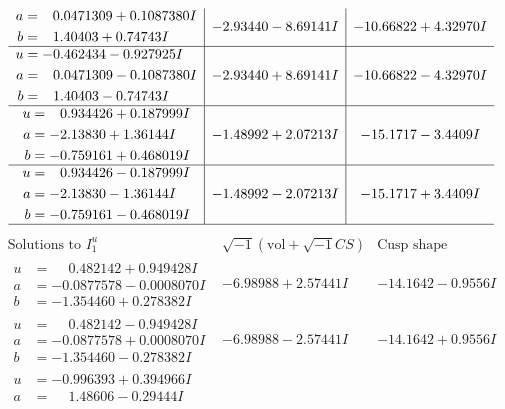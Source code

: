 \documentclass[1p]{elsarticle_modified}
\theoremstyle{definition}
\newcommand{\I}{\sqrt{-1}}
\begin{document}
$$\begin{array}{c|c|c}
\begin{aligned}
a &= \phantom{-}0.0471309 + 0.1087380 I \\
b &= \phantom{-}1.40403 + 0.74743 I\end{aligned}
 & -2.93440 - 8.69141 I & -10.66822 + 4.32970 I \\ \hline\begin{aligned}
u &= -0.462434 - 0.927925 I \\
a &= \phantom{-}0.0471309 - 0.1087380 I \\
b &= \phantom{-}1.40403 - 0.74743 I\end{aligned}
 & -2.93440 + 8.69141 I & -10.66822 - 4.32970 I \\ \hline\begin{aligned}
u &= \phantom{-}0.934426 + 0.187999 I \\
a &= -2.13830 + 1.36144 I \\
b &= -0.759161 + 0.468019 I\end{aligned}
 & -1.48992 + 2.07213 I & -15.1717 - 3.4409 I \\ \hline\begin{aligned}
u &= \phantom{-}0.934426 - 0.187999 I \\
a &= -2.13830 - 1.36144 I \\
b &= -0.759161 - 0.468019 I\end{aligned}
 & -1.48992 - 2.07213 I & -15.1717 + 3.4409 I\\
 \hline 
 \end{array}$$\newpage$$\begin{array}{c|c|c}  
\text{Solutions to }I^u_{1}& \I (\text{vol} + \sqrt{-1}CS) & \text{Cusp shape}\\
 \hline 
\begin{aligned}
u &= \phantom{-}0.482142 + 0.949428 I \\
a &= -0.0877578 - 0.0008070 I \\
b &= -1.354460 + 0.278382 I\end{aligned}
 & -6.98988 + 2.57441 I & -14.1642 - 0.9556 I \\ \hline\begin{aligned}
u &= \phantom{-}0.482142 - 0.949428 I \\
a &= -0.0877578 + 0.0008070 I \\
b &= -1.354460 - 0.278382 I\end{aligned}
 & -6.98988 - 2.57441 I & -14.1642 + 0.9556 I \\ \hline\begin{aligned}
u &= -0.996393 + 0.394966 I \\
a &= \phantom{-}1.48606 - 0.29444 I \\

\end{aligned}
\end{array}$$
\end{document}

